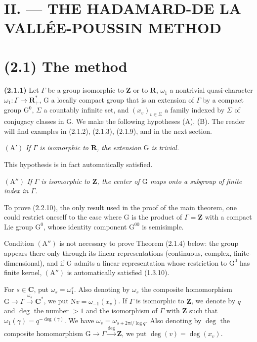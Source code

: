\documentclass[11pt,leqno]{article}
\newcommand{\Page}[1]{\ifvmode\noindent\else\unskip\ \fi{\footnotesize\textcolor{gray}{[p.\,#1]}}\ \ignorespaces}
\begin{document}
\Page{187}
\section*{II. — THE HADAMARD-DE LA VALLÉE-POUSSIN METHOD}

\section*{(2.1) The method}

\textbf{(2.1.1)} Let \(\Gamma\) be a group isomorphic to \(\mathbf{Z}\) or to \(\mathbf{R}\), \(\omega_1\) a nontrivial quasi-character \(\omega_1:\Gamma\to\mathbf{R}_+^*\), \(\mathrm{G}\) a locally compact group that is an extension of \(\Gamma\) by a compact group \(\mathrm{G}^0\), \(\Sigma\) a countably infinite set, and \((x_v)_{v\in\Sigma}\) a family indexed by \(\Sigma\) of conjugacy classes in \(\mathrm{G}\). We make the following hypotheses (A), (B). The reader will find examples in (2.1.2), (2.1.3), (2.1.9), and in the next section.

\((\mathrm{A}')\) \textit{If \(\Gamma\) is isomorphic to \(\mathbf{R}\), the extension \(\mathrm{G}\) is trivial.}

This hypothesis is in fact automatically satisfied.

\((\mathrm{A}'')\) \textit{If \(\Gamma\) is isomorphic to \(\mathbf{Z}\), the center of \(\mathrm{G}\) maps onto a subgroup of finite index in \(\Gamma\).}

To prove (2.2.10), the only result used in the proof of the main theorem, one could restrict oneself to the case where \(\mathrm{G}\) is the product of \(\Gamma=\mathbf{Z}\) with a compact Lie group \(\mathrm{G}^0\), whose identity component \(\mathrm{G}^{00}\) is semisimple.

Condition \((\mathrm{A}'')\) is not necessary to prove Theorem (2.1.4) below: the group appears there only through its linear representations (continuous, complex, finite-dimensional), and if \(\mathrm{G}\) admits a linear representation whose restriction to \(\mathrm{G}^0\) has finite kernel, \((\mathrm{A}'')\) is automatically satisfied (1.3.10).

For \(s\in\mathbf{C}\), put \(\omega_s=\omega_1^s\). Also denoting by \(\omega_s\) the composite homomorphism \(\mathrm{G}\to\Gamma\xrightarrow{\omega_s}\mathbf{C}^*\), we put \(\mathrm{N}v=\omega_{-1}(x_v)\). If \(\Gamma\) is isomorphic to \(\mathbf{Z}\), we denote by \(q\) and \(\deg\) the number \(>1\) and the isomorphism of \(\Gamma\) with \(\mathbf{Z}\) such that \(\omega_1(\gamma)=q^{-\deg(\gamma)}\). We have \(\omega_s=\omega_{s+2\pi i/\log q}\). Also denoting by \(\deg\) the composite homomorphism \(\mathrm{G}\to\Gamma\xrightarrow{\deg}\mathbf{Z}\), we put \(\deg(v)=\deg(x_v)\).
\end{document}
